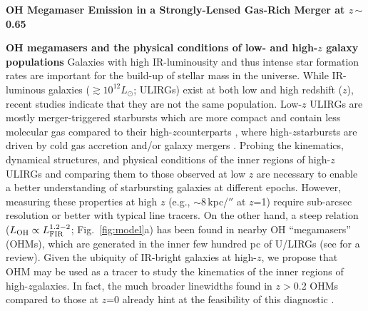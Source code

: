 \documentclass[letterpaper,11pt]{article}
\newcommand{\Lsun}{\mbox{$L_{\odot}$}\xspace}
\newcommand{\Fig}[1]{Fig.~\ref{fig:#1}}
\newcommand{\ssim}{\,$\sim$\,}
\newcommand{\highz}{high-$z$\space}
\newcommand{\galpop}{galaxy populations\xspace}
\begin{document}
\pagestyle{plain}



\begin{center}
{\large{\bf{OH Megamaser Emission in a Strongly-Lensed Gas-Rich Merger at $z$\ssim0.65}}}
\end{center}
\vspace{-.8em}
\textbf{OH megamasers and the physical conditions of low- and high-$z$ \galpop}
Galaxies with high IR-luminousity and thus intense star formation rates are important for the build-up of stellar mass in the universe. 
While IR-luminous galaxies ($\gtrsim10^{12}$\Lsun; ULIRGs) 
exist at both low and high redshift ($z$), recent studies indicate that they are not the same population. 
Low-$z$ ULIRGs are mostly merger-triggered starbursts which are more compact and contain
less molecular gas compared to their \highz counterparts \citep{Veilleux02a, Hopkins10a, Rujopakarn11a, Rujopakarn13a},
where \highz starbursts are driven by cold gas accretion \citep[e.g.,][]{Dekel09b} 
and/or galaxy mergers \citep{Riechers11a, Riechers13b, Hayward12a}.
Probing the kinematics, dynamical structures, and physical conditions of the inner regions of \highz ULIRGs 
and comparing them to those observed at low $z$ 
are necessary to enable a better understanding of starbursting galaxies at different epochs.
However, measuring these properties at high $z$ (e.g., $\sim$8\,kpc/$''$ at $z$=1)
require sub-arcsec resolution or better with typical line tracers. On the other hand, a 
steep relation ($L_{\rm OH}\propto L_{\rm FIR}^{1.2-2}$; \Fig{model}a) has been found in nearby OH ``megamasers'' 
(OHMs), which are generated in the inner few hundred pc of U/LIRGs (see \citealt[]{Lo05a} for a review).
Given the ubiquity of IR-bright galaxies at high-$z$, we propose that OHM may be used as a tracer to 
study the kinematics of the inner regions of \highz galaxies.
In fact, the much broader linewidths found in $z$$>$0.2 OHMs compared to those at $z$=0 already hint at the feasibility of 
this diagnostic \citep[hereafter DG02]{Baan92a, Darling02a}.
\end{document}
